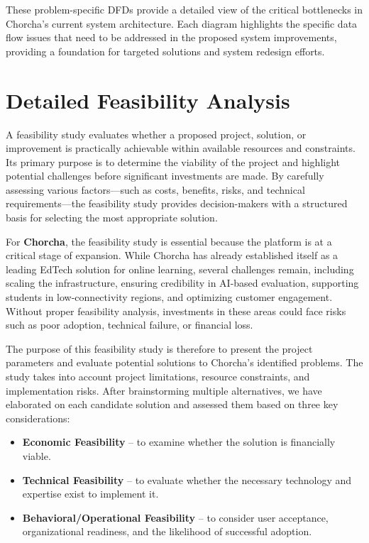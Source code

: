 \documentclass[12pt,a4paper,oneside]{book}
\begin{document}
\vspace{0.5cm}

These problem-specific DFDs provide a detailed view of the critical bottlenecks in Chorcha's current system architecture. Each diagram highlights the specific data flow issues that need to be addressed in the proposed system improvements, providing a foundation for targeted solutions and system redesign efforts.

\section{Detailed Feasibility Analysis}

A feasibility study evaluates whether a proposed project, solution, or improvement is practically achievable within available resources and constraints. Its primary purpose is to determine the viability of the project and highlight potential challenges before significant investments are made. By carefully assessing various factors---such as costs, benefits, risks, and technical requirements---the feasibility study provides decision-makers with a structured basis for selecting the most appropriate solution.

For \textbf{Chorcha}, the feasibility study is essential because the platform is at a critical stage of expansion. While Chorcha has already established itself as a leading EdTech solution for online learning, several challenges remain, including scaling the infrastructure, ensuring credibility in AI-based evaluation, supporting students in low-connectivity regions, and optimizing customer engagement. Without proper feasibility analysis, investments in these areas could face risks such as poor adoption, technical failure, or financial loss.

The purpose of this feasibility study is therefore to present the project parameters and evaluate potential solutions to Chorcha’s identified problems. The study takes into account project limitations, resource constraints, and implementation risks. After brainstorming multiple alternatives, we have elaborated on each candidate solution and assessed them based on three key considerations:
\begin{itemize}
    \item \textbf{Economic Feasibility} -- to examine whether the solution is financially viable.
    \item \textbf{Technical Feasibility} -- to evaluate whether the necessary technology and expertise exist to implement it.
    \item \textbf{Behavioral/Operational Feasibility} -- to consider user acceptance, organizational readiness, and the likelihood of successful adoption.
\end{itemize}
\end{document}
